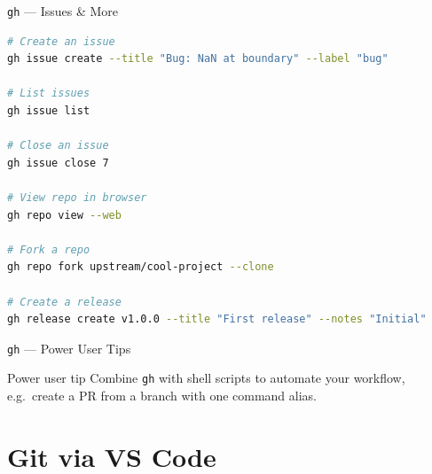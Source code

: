 \documentclass[aspectratio=169, 11pt]{beamer}
\begin{document}
\begin{frame}[fragile]{\texttt{gh} --- Issues \& More}
  \begin{lstlisting}[language=bash]
# Create an issue
gh issue create --title "Bug: NaN at boundary" --label "bug"

# List issues
gh issue list

# Close an issue
gh issue close 7

# View repo in browser
gh repo view --web

# Fork a repo
gh repo fork upstream/cool-project --clone

# Create a release
gh release create v1.0.0 --title "First release" --notes "Initial"
  \end{lstlisting}
\end{frame}

\begin{frame}[fragile]{\texttt{gh} --- Power User Tips}
  \vspace{0.3em}
  \begin{block}{Power user tip}
    Combine \texttt{gh} with shell scripts to automate your workflow, e.g.\ create a PR from a branch with one command alias.
  \end{block}
\end{frame}

\section{Git via VS Code}
\end{document}
